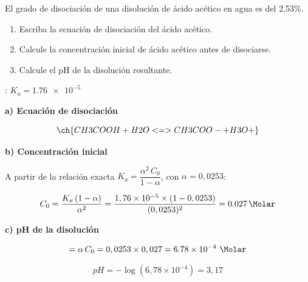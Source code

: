 
\begin{exerciseEVAU}
    El grado de disociación de una disolución de ácido acético en agua es del \num{2.53}\%.
    \begin{enumerate}[label=\letraminuscula]
        \item Escriba la ecuación de disociación del ácido acético.
        \item Calcule la concentración inicial de ácido acético antes de disociarse.
        \item Calcule el pH de la disolución resultante.
    \end{enumerate}
    \datos{}: \(K_a = \num{1.76e-5}\)


    \begin{solu}


        \textbf{a) Ecuación de disociación}

        \begin{equation*}
            \ch{CH3COOH + H2O <=> CH3COO- + H3O+}
        \end{equation*}

        \textbf{b) Concentración inicial}

        A partir de la relación exacta \(K_a = \dfrac{\alpha^2\, C_0}{1-\alpha}\), con \(\alpha = 0,0253\):

        \begin{equation*}
            C_0 = \dfrac{K_a\,(1-\alpha)}{\alpha^2} = \dfrac{1,76\times10^{-5}\times(1-0,0253)}{(0,0253)^2} = \SI{0.027}{\Molar}
        \end{equation*}

        \textbf{c) pH de la disolución}

        \begin{equation*}
            [\ch{H3O+}] = \alpha\, C_0 = 0,0253 \times 0,027 = \num{6.78e-4} \ \si{\Molar}
        \end{equation*}

        \begin{equation*}
            pH = -\log(6,78\times10^{-4}) = 3,17
        \end{equation*}

    \end{solu}
\end{exerciseEVAU}



